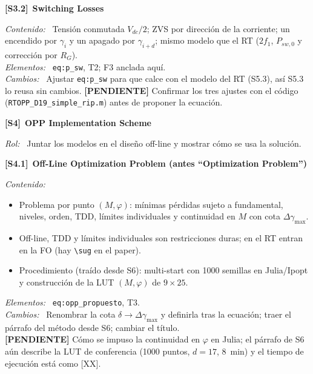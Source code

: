 \documentclass[11pt,a4paper]{article}
\newcommand{\bloque}[2]{%
  \vspace{2mm}\noindent
  {\color{IDblue}\textbf{[#1]}}\ \textbf{#2}\par\vspace{0.5mm}}
\newcommand{\campo}[1]{\noindent\textit{#1:}\ }
\newcommand{\pendiente}[1]{{\color{Warn}\textbf{[PENDIENTE]} #1}}
\begin{document}
\bloque{S3.2}{Switching Losses}
\campo{Contenido} Tensión conmutada $V_{dc}/2$; ZVS por dirección de la
corriente; un encendido por $\gamma_i$ y un apagado por $\gamma_{i+d}$;
mismo modelo que el RT ($2f_1$, $P_{sw,0}$ y corrección por $R_G$).\\
\campo{Elementos} \texttt{eq:p\_sw}, T2; F3 anclada aquí.\\
\campo{Cambios} Ajustar \texttt{eq:p\_sw} para que calce con el modelo del
RT (S5.3), así S5.3 lo reusa sin cambios.
\pendiente{Confirmar los tres ajustes con el código
(\texttt{RTOPP\_D19\_simple\_rip.m}) antes de proponer la ecuación.}

\bloque{S4}{OPP Implementation Scheme}
\campo{Rol} Juntar los modelos en el diseño off-line y mostrar cómo se usa
la solución.

\bloque{S4.1}{Off-Line Optimization Problem (antes ``Optimization Problem'')}
\campo{Contenido}
\begin{itemize}
\item Problema por punto $(M,\varphi)$: mínimas pérdidas sujeto a
      fundamental, niveles, orden, TDD, límites individuales y continuidad
      en $M$ con cota $\Delta\gamma_{\max}$.
\item Off-line, TDD y límites individuales son restricciones duras; en el
      RT entran en la FO (hay \texttt{\textbackslash sug} en el paper).
\item Procedimiento (traído desde S6): multi-start con 1000 semillas en
      Julia/Ipopt y construcción de la LUT $(M,\varphi)$ de $9\times25$.
\end{itemize}
\campo{Elementos} \texttt{eq:opp\_propuesto}, T3.\\
\campo{Cambios} Renombrar la cota $\delta\rightarrow\Delta\gamma_{\max}$ y
definirla tras la ecuación; traer el párrafo del método desde S6; cambiar
el título.\\
\pendiente{Cómo se impuso la continuidad en $\varphi$ en Julia; el
párrafo de S6 aún describe la LUT de conferencia (1000 puntos, $d=17$,
8~min) y el tiempo de ejecución está como [XX].}
\end{document}

